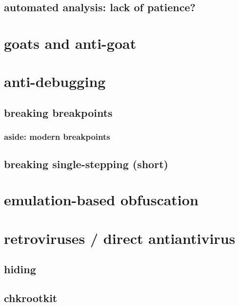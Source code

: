 \subsection{automated analysis: lack of patience?}


\section{goats and anti-goat}


\section{anti-debugging}


\subsection{breaking breakpoints}



\subsubsection{aside: modern breakpoints}


\subsection{breaking single-stepping (short)}


\section{emulation-based obfuscation}


\section{retroviruses / direct antiantivirus}


\subsection{hiding}


\subsection{chkrootkit}



